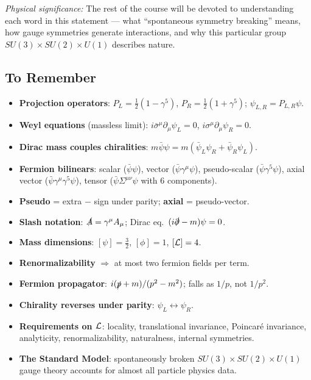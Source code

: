 \documentclass[../main.tex]{subfiles}
\begin{document}
\textit{Physical significance:} The rest of the course will be devoted to understanding each word in this statement — what ``spontaneous symmetry breaking'' means, how gauge symmetries generate interactions, and why this particular group $SU(3)\times SU(2)\times U(1)$ describes nature.

\subsection*{To Remember}

\begin{itemize}
  \item \textbf{Projection operators}: $P_L = \tfrac{1}{2}(1-\gamma^5)$, $P_R = \tfrac{1}{2}(1+\gamma^5)$; $\psi_{L,R} = P_{L,R}\psi$.

  \item \textbf{Weyl equations} (massless limit): $i\bar\sigma^\mu\partial_\mu\psi_L = 0$, $i\sigma^\mu\partial_\mu\psi_R = 0$.

  \item \textbf{Dirac mass couples chiralities}: $m\bar\psi\psi = m(\bar\psi_L\psi_R + \bar\psi_R\psi_L)$.

  \item \textbf{Fermion bilinears}: scalar ($\bar\psi\psi$), vector ($\bar\psi\gamma^\mu\psi$), pseudo-scalar ($\bar\psi\gamma^5\psi$), axial vector ($\bar\psi\gamma^\mu\gamma^5\psi$), tensor ($\bar\psi\Sigma^{\mu\nu}\psi$ with 6 components).

  \item \textbf{Pseudo} = extra $-$ sign under parity; \textbf{axial} = pseudo-vector.

  \item \textbf{Slash notation}: $\slashed{A} = \gamma^\mu A_\mu$; Dirac eq.\ $(i\slashed\partial - m)\psi = 0$.

  \item \textbf{Mass dimensions}: $[\psi] = \tfrac{3}{2}$, $[\phi] = 1$, $[\mathcal{L}] = 4$.

  \item \textbf{Renormalizability} $\Rightarrow$ at most two fermion fields per term.

  \item \textbf{Fermion propagator}: $i(\slashed{p}+m)/(p^2-m^2)$; falls as $1/p$, not $1/p^2$.

  \item \textbf{Chirality reverses under parity}: $\psi_L \leftrightarrow \psi_R$.

  \item \textbf{Requirements on $\mathcal{L}$}: locality, translational invariance, Poincaré invariance, analyticity, renormalizability, naturalness, internal symmetries.

  \item \textbf{The Standard Model}: spontaneously broken $SU(3)\times SU(2)\times U(1)$ gauge theory accounts for almost all particle physics data.
\end{itemize}
\end{document}

